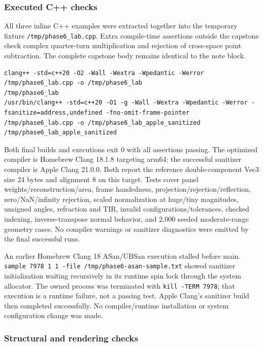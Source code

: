 \subsubsection{Executed C++ checks}\label{appendix-a103e7846d21-executed-c-checks}

All three inline C++ examples were extracted together into the temporary fixture \texttt{/tmp/phase6\_lab.cpp}. Extra compile-time assertions outside the capstone check complex quarter-turn multiplication and rejection of cross-space point subtraction. The complete capstone body remains identical to the note block.

\begin{verbatim}
clang++ -std=c++20 -O2 -Wall -Wextra -Wpedantic -Werror /tmp/phase6_lab.cpp -o /tmp/phase6_lab
/tmp/phase6_lab
/usr/bin/clang++ -std=c++20 -O1 -g -Wall -Wextra -Wpedantic -Werror -fsanitize=address,undefined -fno-omit-frame-pointer /tmp/phase6_lab.cpp -o /tmp/phase6_lab_apple_sanitized
/tmp/phase6_lab_apple_sanitized
\end{verbatim}

Both final builds and executions exit 0 with all assertions passing. The optimized compiler is Homebrew Clang 18.1.8 targeting arm64; the successful sanitizer compiler is Apple Clang 21.0.0. Both report the reference double-component Vec3 size 24 bytes and alignment 8 on this target. Tests cover panel weights/reconstruction/area, frame handedness, projection/rejection/reflection, zero/NaN/infinity rejection, scaled normalization at huge/tiny magnitudes, unsigned angles, refraction and TIR, invalid configurations/tolerances, checked indexing, inverse-transpose normal behavior, and 2,000 seeded moderate-range geometry cases. No compiler warnings or sanitizer diagnostics were emitted by the final successful runs.

An earlier Homebrew Clang 18 ASan/UBSan execution stalled before main. \texttt{sample\ 7978\ 1\ 1\ -file\ /tmp/phase6-asan-sample.txt} showed sanitizer initialization waiting recursively in its runtime spin lock through the system allocator. The owned process was terminated with \texttt{kill\ -TERM\ 7978}; that execution is a runtime failure, not a passing test. Apple Clang's sanitizer build then completed successfully. No compiler/runtime installation or system configuration change was made.

\subsubsection{Structural and rendering checks}\label{appendix-a103e7846d21-structural-and-rendering-checks}

